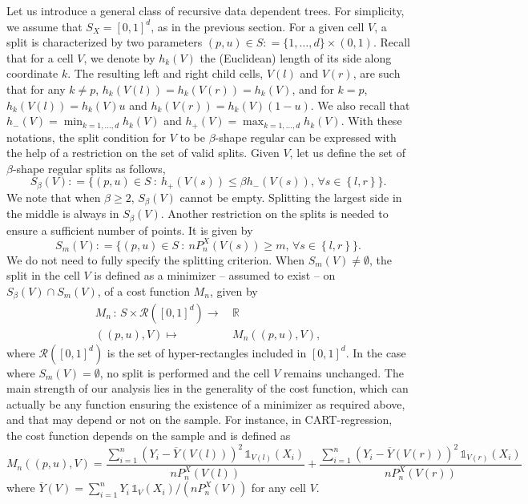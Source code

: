 \documentclass[paper=a4, fontsize=11pt]{scrartcl}
\newcommand{\ind}{\mathds{1}}
\begin{document}
Let us introduce a general class of recursive data dependent trees. For simplicity, we assume that  $S_X = [0,1]^d$, as in the previous section. 
For a given cell $V$, a split is characterized by two parameters $(p, u) \in S : = \{ 1,\ldots, d\}\times  (0,1)$. Recall that for a cell $V$, we denote by $h_k(V)$ the (Euclidean) length of its side along coordinate $k$. The resulting left and right child cells, $V(l)$  and $V(r)$, are such that for any $k \neq p$, $h_k(V(l))=h_k(V(r))  = h _k (V) $, and for $k=p$, $ h_k(V(l)) = h_k(V) u$ and $ h_k(V(r)) = h_k(V) (1-u) $. We also recall that $h_-(V) = \min_{k = 1,\ldots, d} h_k(V) $ and $h_+(V) = \max_{k = 1,\ldots, d} h_k(V) $. With these notations, the split condition for $V$ to be $\beta$-shape regular can be expressed with the help of a restriction on the set of valid splits. Given $V$, let us define the set of $\beta$-shape regular splits as follows,
$$ S_\beta(V) : = \{  (p,u)  \in S  \  : \  h_+( V(s)) \leq \beta h_-( V(s)),\,  \forall s  \in \left\{ l,r \right\}   \}. $$
We note that when $\beta \geq 2$, $S_\beta(V)$ cannot be empty. Splitting the largest side in the middle is always in $ S_\beta(V) $. Another restriction on the splits is needed to ensure a sufficient number of points. It is given by
$$ S_m(V) : = \{  (p,u) \in S  \  : \  n P_n^X( V(s) ) \geq m , \, \forall s  \in \left\{ l,r \right\}   \} .$$
We do not need to fully specify the splitting criterion. When $S_m(V)\neq \emptyset$, the split in the cell $V$ is defined as a minimizer -- assumed to exist -- on $S_\beta(V)  \cap S_m(V)$, of a cost function $M_n$, given by
\begin{align*}
    M_n\, : \, S \times \mathcal R ([0,1]^d)  \to &\, \mathbb R \\
    ((p,u), V) \mapsto &\,  M_n ((p,u), V),
\end{align*}
where $ \mathcal R ([0,1]^d)$ is the set of hyper-rectangles included in $[0,1]^d$. In the case where $S_m(V) = \emptyset$, no split is performed and the cell $V$ remains unchanged. The main strength of our analysis lies in the generality of the cost function, which can actually be any function ensuring the existence of a minimizer as required above, and that may depend or not on the sample. For instance, in CART-regression, the cost function depends on the sample and is defined as
$$ M_n ((p,u), V) = \frac{\sum_{i=1}^n (Y_i - \overline Y( V(l))) ^2 \, \ind_{V(l)}(X_i)}{n P_n^X (V(l) )  }  + \frac{\sum_{i=1}^n (Y_i - \overline Y(V(r)))^2 \, \ind_{V(r)}(X_i)}{n P_n^X(V(r) )   } $$
where $ \overline Y(V )= \sum_{i=1}^n Y_i \, \ind_{V}(X_i) / (n P_n^X (V ))$ for any cell $V$. 
\end{document}
